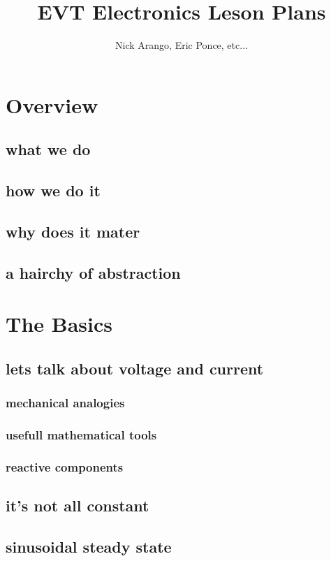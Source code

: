 \documentclass[]{journal}
\begin{document}
\title{EVT Electronics Leson Plans}
\author{Nick Arango, Eric Ponce, etc...}
\maketitle

\section{Overview}
	\subsection{what we do}
	\subsection{how we do it}
	\subsection{why does it mater} 
	\subsection{a hairchy of abstraction} 

\section{The Basics}
	\subsection{lets talk about voltage and current}
		\subsubsection{mechanical analogies}
		\subsubsection{usefull mathematical tools}
		\subsubsection{reactive components}
	\subsection{it's not all constant}
		\subsection{sinusoidal steady state}
\end{document}
